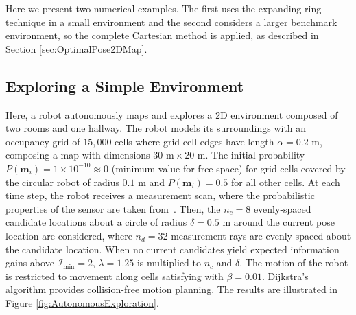 Here we present two numerical examples. The first uses the expanding-ring technique in a small environment and the second considers a larger benchmark environment, so the complete Cartesian method is applied, as described in Section \ref{sec:OptimalPose2DMap}.

\subsection{Exploring a Simple Environment}

Here, a robot autonomously maps and explores a 2D environment composed of two rooms and one hallway. The robot models its surroundings with an occupancy grid of $15,000$ cells where grid cell edges have length $\alpha=0.2$ m, composing a map with dimensions $30\text{ m}\times20\text{ m}$. The initial probability $P(\mathbf{m}_i)=1\times10^{-10}\approx0$ (minimum value for free space) for grid cells covered by the circular robot of radius $0.1$ m and $P(\mathbf{m}_i)=0.5$ for all other cells.
At each time step, the robot receives a measurement scan, where the probabilistic properties of the sensor are taken from~\cite{PirRutBisSch11,KhoElb12}. Then, the $n_c=8$ evenly-spaced candidate locations about a circle of radius $\delta=0.5$ m around the current pose location are considered, where $n_d=32$ measurement rays are evenly-spaced about the candidate location.  When no current candidates yield expected information gains above $\mathcal I_\text{min}=2$, $\lambda=1.25$ is multiplied to $n_c$ and $\delta$. The motion of the robot is restricted to movement along cells satisfying  with $\beta=0.01$. Dijkstra's algorithm provides collision-free motion planning.
The results are illustrated in Figure \ref{fig:AutonomousExploration}.


